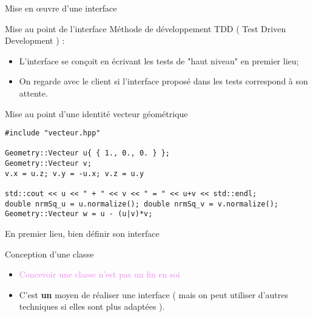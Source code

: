 \documentclass[handout,10pt]{beamer}
\begin{document}
\begin{frame}[fragile]{Mise en {\oe}uvre d'une interface}
\tiny
\begin{exampleblock}{Mise au point de l'interface}
Méthode de développement TDD ( Test Driven Development ) :
\begin{itemize}
\item L'interface se conçoit en écrivant les tests de "haut niveau" en premier lieu;
\item On regarde avec le client si l'interface proposé dans les tests correspond à son attente.
\end{itemize}
\end{exampleblock}
\begin{block}{Mise au point d'une identité vecteur géométrique}
\begin{lstlisting}
#include "vecteur.hpp"

Geometry::Vecteur u{ { 1., 0., 0. } };
Geometry::Vecteur v;
v.x = u.z; v.y = -u.x; v.z = u.y

std::cout << u << " + " << v << " = " << u+v << std::endl;
double nrmSq_u = u.normalize(); double nrmSq_v = v.normalize();
Geometry::Vecteur w = u - (u|v)*v;
\end{lstlisting}
\alert{En premier lieu, bien définir son interface}
\end{block}

\begin{block}{Conception d'une classe}
\begin{itemize}
\item \textcolor{violet}{Concevoir une classe n'est pas un fin en soi}
\item C'est \textbf{un} moyen de réaliser une interface ( mais on peut utiliser d'autres techniques si elles sont plus adaptées ).
\end{itemize}
\end{block}

\end{frame}
\end{document}
